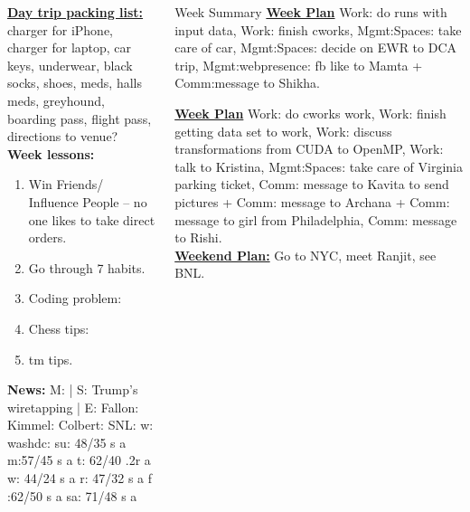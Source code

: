 \begin{columns}
\begin{column}{0.25\linewidth}
      \begin{block}
      
      {\underline{\bf Day trip packing list:} charger for iPhone,
        charger for laptop, car keys, underwear, black socks, shoes,
        meds, halls meds, greyhound, boarding pass, flight pass, directions to
        venue?} \\ 
      {\tiny {\bf Week lessons:}} \\ 
      \begin{enumerate}
        \tiny \item \tiny Win Friends/ Influence People – no one
        likes to take direct orders.
      \item \tiny Go through 7 habits.
      \item \tiny Coding problem: 
      \item \tiny Chess tips: 
      \item \tiny tm tips.
      \end{enumerate}
          {{\tiny {\bf News:}} M:  | S:  Trump's wiretapping  | E:
            Fallon:   Kimmel:  Colbert: SNL:
            w: washdc: 
            {su: {48/35 s a}}  
            {m:{57/45 s a}} 
            {t: {62/40 .2r a}} 
            {w: {44/24 s a}} 
            {r: {47/32 s a}} 
            {f :{62/50 s a} }
            {sa: {71/48 s a}}} 
    \end{block}
    
  \end{column}     
 
  \begin{column}{0.5\linewidth}
    \begin{block}{Week Summary} 
      {\underline {\bf Week Plan} Work: do runs with input data, Work:
        finish cworks, Mgmt:Spaces: take care of car, Mgmt:Spaces:
        decide on EWR to DCA trip, Mgmt:webpresence: fb like to Mamta
        + Comm:message to Shikha.}

      {\underline{\bf Week Plan}
        Work: do cworks work, Work: finish getting data set to work,
        Work: discuss transformations from CUDA to OpenMP, Work: talk
        to Kristina, Mgmt:Spaces: take care of Virginia parking ticket, Comm:
        message to Kavita to send pictures + Comm: message to Archana
        + Comm: message to girl from Philadelphia, Comm: message to
        Rishi. }\\ 

      {\underline{\bf Weekend Plan:} Go to NYC, meet Ranjit, see BNL.}\\


\end{block}
\end{column}
\end{columns}
